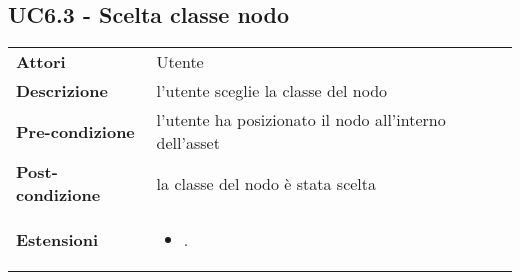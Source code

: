 \subsection{UC6.3 - Scelta classe nodo}
\label{sssec:UC6.3}
\def\arraystretch{1.5}
\begin{tabularx}{\textwidth}{l|p{}}
\rowcolor{I} \multicolumn{2}{c}{\color{white}\textbf{UC6.3 - Scelta classe nodo}} \\
\toprule
\endhead
\textbf{Attori} & Utente\\
\textbf{Descrizione} & l'utente sceglie la classe del nodo\\
\textbf{Pre-condizione} & l'utente ha posizionato il nodo all'interno dell'asset\\
\textbf{Post-condizione} & la classe del nodo è stata scelta\\
\textbf{Estensioni} & \vspace{-1.2em}\begin{itemize}[leftmargin=*,noitemsep,nosep]
\item \nameref{sssec:UC6.5}.
\end{itemize}\\
\bottomrule
\end{tabularx}
